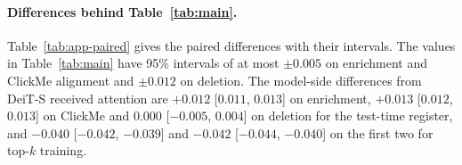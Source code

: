 \begin{table}[!htbp]
\caption{Per-layer diagnostics (Fig.~\ref{fig:diag}a--c) and uncorrected ClickMe alignment (last three columns). S, B, D: DeiT-S, DeiT-B, DINO ViT-S; probe chance: 0.5\%. Values are rounded; DINO layers 9--12 have exactly zero high-norm attention on this dataset.}
\label{tab:app-diag}
\centering

\end{table}

\begin{table}[!tbp]
\caption{Paired differences, layers 9--12: mean, 95\% image-bootstrap interval and verdict (\textit{h}/\textit{c}/\textit{l}: higher/comparable/lower). Margins: 0.02 (enrichment/ClickMe), 0.05 (deletion); intervals unadjusted. Samples: App.~\ref{app:setup}. Top: descriptive correction--R0 contrasts and the primary combination--R0 contrasts. Bottom: primary correction--control contrasts. Registered negative controls are also discussed in App.~\ref{app:setup}.}
\label{tab:app-paired}
\centering

\end{table}

\paragraph{Differences behind Table~\ref{tab:main}.} Table~\ref{tab:app-paired} gives the paired differences with their intervals. The values in Table~\ref{tab:main} have 95\% intervals of at most $\pm0.005$ on enrichment and ClickMe alignment and $\pm0.012$ on deletion. The model-side differences from DeiT-S received attention are $+0.012$ [$0.011$, $0.013$] on enrichment, $+0.013$ [$0.012$, $0.013$] on ClickMe and $0.000$ [$-0.005$, $0.004$] on deletion for the test-time register, and $-0.040$ [$-0.042$, $-0.039$] and $-0.042$ [$-0.044$, $-0.040$] on the first two for top-$k$ training.

